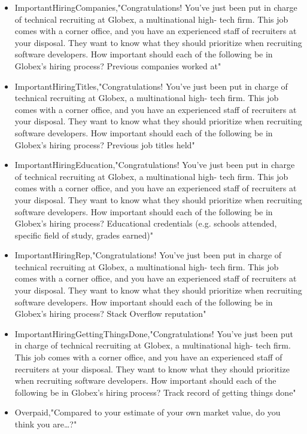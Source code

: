 \begin{appendices}
\begin{itemize}
        \item ImportantHiringCompanies,"Congratulations! You've just been put in charge of technical recruiting at Globex, a multinational high- tech firm. This job comes with a corner office, and you have an experienced staff of recruiters at your disposal. They want to know what they should prioritize when recruiting software developers. How important should each of the following be in Globex's hiring process? Previous companies worked at"
        \item ImportantHiringTitles,"Congratulations! You've just been put in charge of technical recruiting at Globex, a multinational high- tech firm. This job comes with a corner office, and you have an experienced staff of recruiters at your disposal. They want to know what they should prioritize when recruiting software developers. How important should each of the following be in Globex's hiring process? Previous job titles held"
        \item ImportantHiringEducation,"Congratulations! You've just been put in charge of technical recruiting at Globex, a multinational high- tech firm. This job comes with a corner office, and you have an experienced staff of recruiters at your disposal. They want to know what they should prioritize when recruiting software developers. How important should each of the following be in Globex's hiring process? Educational credentials (e.g. schools attended, specific field of study, grades earned)"
        \item ImportantHiringRep,"Congratulations! You've just been put in charge of technical recruiting at Globex, a multinational high- tech firm. This job comes with a corner office, and you have an experienced staff of recruiters at your disposal. They want to know what they should prioritize when recruiting software developers. How important should each of the following be in Globex's hiring process? Stack Overflow reputation"
        \item ImportantHiringGettingThingsDone,"Congratulations! You've just been put in charge of technical recruiting at Globex, a multinational high- tech firm. This job comes with a corner office, and you have an experienced staff of recruiters at your disposal. They want to know what they should prioritize when recruiting software developers. How important should each of the following be in Globex's hiring process? Track record of getting things done"
        \item Overpaid,"Compared to your estimate of your own market value, do you think you are…?"

\end{itemize}
\end{appendices}
